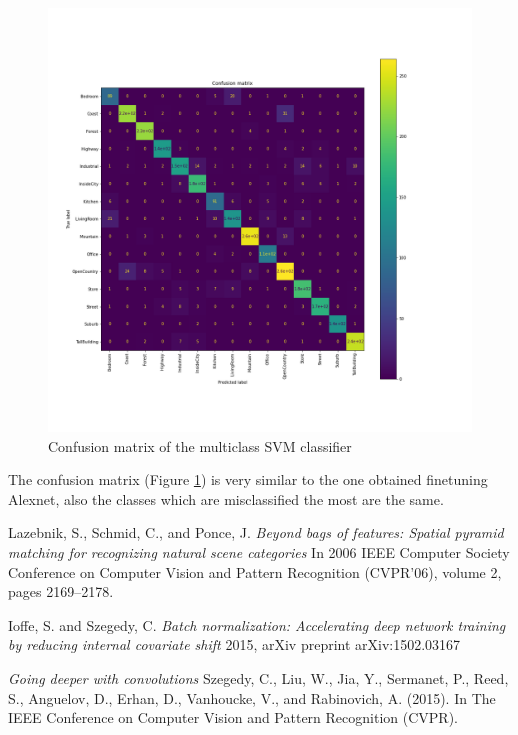 \documentclass[12pt, a4paper]{report}
\begin{document}
\begin{figure}[h!]
	\centering
	\includegraphics[width=\textwidth]{img/confusion_multiclassSVM}
	\caption{Confusion matrix of the multiclass SVM classifier}	
	\label{fig:svm}
\end{figure}

The confusion matrix (Figure \ref{fig:svm}) is very similar to the one obtained finetuning Alexnet, also the classes which are misclassified the most are the same.

\begin{thebibliography}{9}
	
	Lazebnik, S., Schmid, C., and Ponce, J.
	\textit{Beyond bags of features: Spatial pyramid matching for recognizing natural scene
	categories}
	In 2006 IEEE Computer Society Conference on Computer Vision	and Pattern Recognition (CVPR’06), volume 2, pages 2169–2178.
	
	Ioffe, S. and Szegedy, C.
	\textit{Batch normalization: Accelerating deep network training by reducing internal covariate shift}
	2015, arXiv	preprint arXiv:1502.03167
	
	\textit{Going deeper with convolutions}
	Szegedy, C., Liu, W., Jia, Y., Sermanet, P., Reed, S., Anguelov, D., Erhan, D., Vanhoucke, V., and Rabinovich, A. (2015). In The IEEE Conference on Computer Vision and Pattern Recognition (CVPR).
	
\end{thebibliography}
\end{document}
